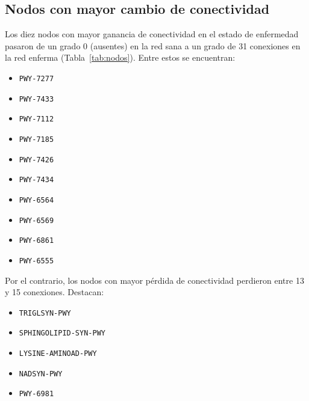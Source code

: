 \documentclass[conference]{IEEEtran}
\begin{document}
\subsection{Nodos con mayor cambio de conectividad}

Los diez nodos con mayor ganancia de conectividad en el estado de enfermedad pasaron de un grado 0 (ausentes) en la red sana a un grado de 31 conexiones en la red enferma (Tabla~\ref{tab:nodos}). Entre estos se encuentran:

\begin{itemize}[leftmargin=*]
    \item \texttt{PWY-7277}
    \item \texttt{PWY-7433}
    \item \texttt{PWY-7112}
    \item \texttt{PWY-7185}
    \item \texttt{PWY-7426}
    \item \texttt{PWY-7434}
    \item \texttt{PWY-6564}
    \item \texttt{PWY-6569}
    \item \texttt{PWY-6861}
    \item \texttt{PWY-6555}
\end{itemize}

Por el contrario, los nodos con mayor pérdida de conectividad perdieron entre 13 y 15 conexiones. Destacan:

\begin{itemize}[leftmargin=*]
    \item \texttt{TRIGLSYN-PWY}
    \item \texttt{SPHINGOLIPID-SYN-PWY} 
    \item \texttt{LYSINE-AMINOAD-PWY}
    \item \texttt{NADSYN-PWY}
    \item \texttt{PWY-6981}
\end{itemize}
\end{document}
